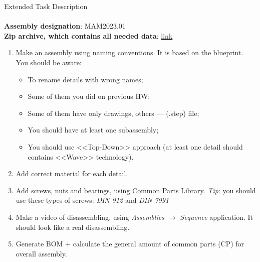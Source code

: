 \documentclass[aspectratio=169]{beamer}
\begin{document}
\begin{frame}[t]{Extended Task Description}
\framesubtitle{}
\vspace{-0.4cm}
\footnotesize
    \textbf{Assembly designation}: MAM2023.01 \\ 
    \textbf{Zip archive, which contains all needed data}: \href{https://disk.yandex.ru/d/6_sWzkoXGTqIrA}{link}
    \vspace{-0.25cm}
    \begin{enumerate}
        \item Make an assembly using naming conventions. It is based on the blueprint. You should be aware:
        \begin{itemize}
            \footnotesize
            \item To rename details with wrong names;
            \item Some of them you did on previous HW;
            \item Some of them have only drawings, others --- (.step) file;
            \item You should have at least one subassembly;
            \item You should use <<Top-Down>> approach (at least one detail should contains <<Wave>> technology).
        \end{itemize}
        \item Add correct material for each detail.
        \item Add screws, nuts and bearings, using \href{https://www.mcmaster.com/}{Common Parts Library}. \textit{Tip}: you should use these types of screws: \textit{DIN 912} and \textit{DIN 7991}
        \item Make a video of disassembling, using \textit{Assemblies $\rightarrow$ Sequence} application. It should look like a real disassembling.
        \item Generate BOM + calculate the general amount of common parts (CP) for overall assembly.
    \end{enumerate}
\end{frame}
\end{document}
